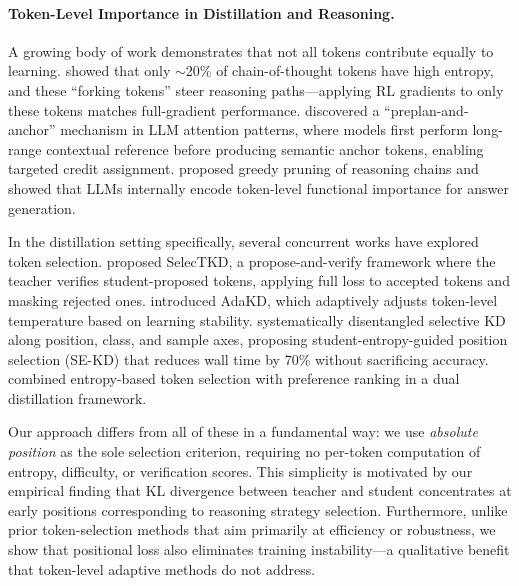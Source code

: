 \paragraph{Token-Level Importance in Distillation and Reasoning.}
A growing body of work demonstrates that not all tokens contribute equally to learning.
\citet{wang2025beyond8020} showed that only $\sim$20\% of chain-of-thought tokens have high entropy, and these ``forking tokens'' steer reasoning paths---applying RL gradients to only these tokens matches full-gradient performance.
\citet{li2025preplan} discovered a ``preplan-and-anchor'' mechanism in LLM attention patterns, where models first perform long-range contextual reference before producing semantic anchor tokens, enabling targeted credit assignment.
\citet{singh2026functional} proposed greedy pruning of reasoning chains and showed that LLMs internally encode token-level functional importance for answer generation.

In the distillation setting specifically, several concurrent works have explored token selection.
\citet{huang2025selectkd} proposed SelecTKD, a propose-and-verify framework where the teacher verifies student-proposed tokens, applying full loss to accepted tokens and masking rejected ones.
\citet{xie2026adakd} introduced AdaKD, which adaptively adjusts token-level temperature based on learning stability.
\citet{tavor2026rethinking} systematically disentangled selective KD along position, class, and sample axes, proposing student-entropy-guided position selection (SE-KD) that reduces wall time by 70\% without sacrificing accuracy.
\citet{kim2026tsdkd} combined entropy-based token selection with preference ranking in a dual distillation framework.

Our approach differs from all of these in a fundamental way: we use \emph{absolute position} as the sole selection criterion, requiring no per-token computation of entropy, difficulty, or verification scores.
This simplicity is motivated by our empirical finding that KL divergence between teacher and student concentrates at early positions corresponding to reasoning strategy selection.
Furthermore, unlike prior token-selection methods that aim primarily at efficiency or robustness, we show that positional loss also eliminates training instability---a qualitative benefit that token-level adaptive methods do not address.

